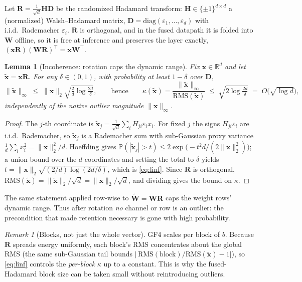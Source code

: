 \documentclass[11pt]{article}
\newtheorem{lemma}{Lemma}
\theoremstyle{remark}
\newtheorem{remark}{Remark}
\newcommand{\R}{\mathbb{R}}
\newcommand{\Prob}{\mathbb{P}}
\newcommand{\norm}[1]{\lVert #1 \rVert}
\newcommand{\rms}{\mathrm{RMS}}
\newcommand{\xt}{\tilde{\bm x}}
\newcommand{\Wt}{\tilde{\bm W}}
\begin{document}
Let $\bm R=\tfrac1{\sqrt d}\bm H\bm D$ be the randomized Hadamard transform:
$\bm H\in\{\pm1\}^{d\times d}$ a (normalized) Walsh--Hadamard matrix,
$\bm D=\mathrm{diag}(\varepsilon_1,\dots,\varepsilon_d)$ with i.i.d.\ Rademacher
$\varepsilon_i$. $\bm R$ is orthogonal, and in the fused datapath it is folded
into $\bm W$ offline, so it is free at inference and preserves the layer exactly,
$(\bm x\bm R)(\bm W\bm R)^{\!\top}=\bm x\bm W^{\!\top}$.

\begin{lemma}[Incoherence: rotation caps the dynamic range]
\label{lem:rot}
Fix $\bm x\in\R^d$ and let $\xt=\bm x\bm R$. For any $\delta\in(0,1)$, with
probability at least $1-\delta$ over $\bm D$,
\begin{equation}
\label{eq:linf}
\norm{\xt}_\infty \;\le\; \norm{\bm x}_2\sqrt{\tfrac{2}{d}\log\tfrac{2d}{\delta}},
\qquad\text{hence}\qquad
\kappa(\xt)=\frac{\norm{\xt}_\infty}{\rms(\xt)}
        \;\le\; \sqrt{2\log\tfrac{2d}{\delta}}\;=\;O\!\big(\sqrt{\log d}\big),
\end{equation}
\emph{independently of the native outlier magnitude} $\norm{\bm x}_\infty$.
\end{lemma}

\begin{proof}
The $j$-th coordinate is $\xt_j=\tfrac1{\sqrt d}\sum_{i}H_{ji}\varepsilon_i x_i$.
For fixed $j$ the signs $H_{ji}\varepsilon_i$ are i.i.d.\ Rademacher, so $\xt_j$
is a Rademacher sum with sub-Gaussian proxy variance
$\tfrac1d\sum_i x_i^2=\norm{\bm x}_2^2/d$. Hoeffding gives
$\Prob(|\xt_j|>t)\le 2\exp\!\big(-t^2 d/(2\norm{\bm x}_2^2)\big)$; a union bound
over the $d$ coordinates and setting the total to $\delta$ yields
$t=\norm{\bm x}_2\sqrt{(2/d)\log(2d/\delta)}$, which is \eqref{eq:linf}. Since
$\bm R$ is orthogonal, $\rms(\xt)=\norm{\xt}_2/\sqrt d=\norm{\bm x}_2/\sqrt d$,
and dividing gives the bound on $\kappa$.
\end{proof}

The same statement applied row-wise to $\Wt=\bm W\bm R$ caps the weight rows'
dynamic range. Thus after rotation \emph{no} channel or row is an outlier: the
precondition that made retention necessary is gone with high probability.

\begin{remark}[Blocks, not just the whole vector]
GF4 scales per block of $b$. Because $\bm R$ spreads energy uniformly, each
block's RMS concentrates about the global RMS (the same sub-Gaussian tail bounds
$\big|\,\rms(\text{block})/\rms(\xt)-1\big|$), so \eqref{eq:linf} controls the
\emph{per-block} $\kappa$ up to a constant. This is why the fused-Hadamard block
size can be taken small without reintroducing outliers.
\end{remark}
\end{document}
